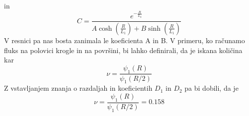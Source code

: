 \documentclass[slovene,11pt,a4paper]{article}
\begin{document}
in 
\begin{equation}
    C=\frac{e^{-\frac{R}{L_2}}}{A\cosh\left(\frac{R}{L_1}\right)+B\sinh\left(\frac{R}{L_1}\right)}
\end{equation}
V resnici pa nas bosta zanimala le koeficienta A in B.
V primeru, ko računamo fluks na polovici krogle in na površini, bi lahko definirali, da je iskana količina kar
\begin{equation}
    \nu=\frac{\psi_1(R)}{\psi_1(R/2)}
\end{equation}
Z vstavljanjem znanja o razdaljah in koeficientih $D_1$ in $D_2$ pa bi dobili, da je 
\begin{equation}
    \nu=\frac{\psi_1(R)}{\psi_1(R/2)}=0.158
\end{equation}
\end{document}
